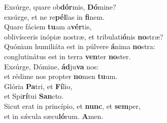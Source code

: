\oddverse Exsúrge, quare ob\textbf{dór}mis, \textbf{Dó}mine?~\*\\
\oddverse exsúrge, et ne re\textbf{pél}las in \textbf{fi}nem.\\
\evenverse Quare fáciem \textbf{tu}am a\textbf{vér}tis,~\*\\
\evenverse oblivísceris inópiæ nostræ, et tribulati\textbf{ó}nis \textbf{no}stræ?\\
\oddverse Quóniam humiliáta est in púlvere \textbf{á}nima \textbf{no}stra:~\*\\
\oddverse conglutinátus est in terra \textbf{ven}ter \textbf{no}ster.\\
\evenverse Exsúrge, Dómine, \textbf{ád}ju\textbf{va} nos:~\*\\
\evenverse et rédime nos propter \textbf{no}men \textbf{tu}um.\\
\oddverse Glória \textbf{Pa}tri, et \textbf{Fí}lio,~\*\\
\oddverse et Spi\textbf{rí}tui \textbf{San}cto.\\
\evenverse Sicut erat in princípio, et \textbf{nunc}, et \textbf{sem}per,~\*\\
\evenverse et in sǽcula sæcu\textbf{ló}rum. \textbf{A}men.\\
